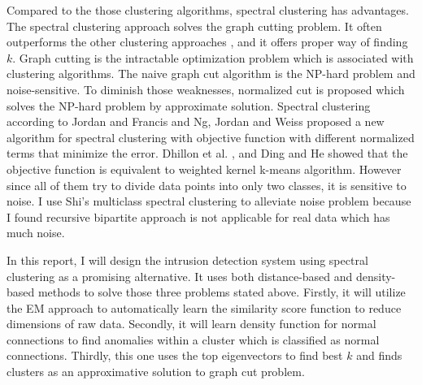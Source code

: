 Compared to the those clustering algorithms, spectral clustering has advantages. 
The spectral clustering approach solves the graph cutting problem. 
It often outperforms the other clustering approaches \cite{ulrike07}, and it offers proper way of finding $k$. 
Graph cutting is the intractable optimization problem which is associated with clustering algorithms. 
The naive graph cut algorithm is the NP-hard problem and noise-sensitive. 
To diminish those weaknesses, normalized cut \cite{jianbo00} is proposed which solves the NP-hard problem by approximate solution. 
Spectral clustering according to Jordan and Francis \cite{jordan04} and Ng, Jordan and Weiss \cite{ng01} proposed a new algorithm for spectral clustering with objective function with different normalized terms that minimize the error. 
Dhillon et al. \cite{dhillon04}, and Ding and He \cite{cding04} showed that the objective function is equivalent to weighted kernel k-means algorithm.
However since all of them try to divide data points into only two classes, it is sensitive to noise.
I use Shi's multiclass spectral clustering \cite{jianbo03} to alleviate noise problem because I found recursive bipartite approach is not applicable for real data which has much noise. 

In this report, I will design the intrusion detection system using spectral clustering as a promising alternative. 
It uses both distance-based and density-based methods to solve those three problems stated above. 
Firstly, it will utilize the EM approach to automatically learn the similarity score function to reduce dimensions of raw data.
Secondly, it will learn density function for normal connections to find anomalies within a cluster which is classified as normal connections. 
Thirdly, this one uses the top eigenvectors to find best $k$ and finds clusters as an approximative solution to graph cut problem. %

